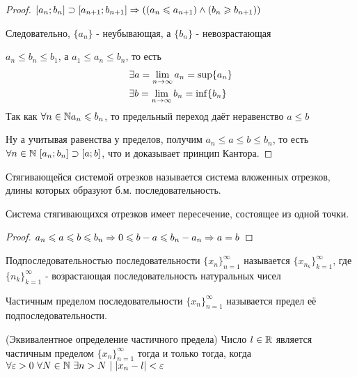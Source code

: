 \begin{proof}
	$[a_n; b_n] \supset [a_{n + 1}; b_{n + 1}] \Rightarrow \left((a_n \leqslant a_{n + 1}) \wedge (b_n \geqslant b_{n + 1})\right)$
	
	Следовательно, $\{a_n\}$ - неубывающая, а $\{b_n\}$ - невозрастающая
	
	$a_n \le b_n \le b_1$, а $a_1 \le a_n \le b_n$, то есть
	\begin{align*}
		&\exists a = \lim\limits_{n \rightarrow \infty} a_n = \sup \{a_n\}
		\\
		&\exists b = \lim\limits_{n \rightarrow \infty} b_n = \inf \{b_n\}
	\end{align*}
	Так как $\forall n \in \mathbb{N} a_n \leqslant b_n$, то предельный переход даёт неравенство $a \le b$
	
	Ну а учитывая равенства у пределов, получим $a_n \le a \le b \le b_n$, то есть $\forall n \in \mathbb{N}\ [a_n; b_n] \supset [a; b]$, что и доказывает принцип Кантора.
\end{proof}

\begin{definition}
	Стягивающейся системой отрезков называется система вложенных отрезков, длины которых образуют б.м. последовательность.
\end{definition}

\begin{addition}
	Система стягивающихся отрезков имеет пересечение, состоящее из одной точки.
\end{addition}

\begin{proof}
	$a_n \leqslant a \leqslant b \leqslant b_n \Rightarrow 0 \leqslant b - a \leqslant b_n - a_n \Rightarrow a = b$
\end{proof}

\begin{definition}
	Подпоследовательностью последовательности $\{x_n\}_{n = 1}^\infty$ называется $\{x_{n_k}\}_{k = 1}^\infty$, где $\{n_k\}_{k = 1}^\infty$ - возрастающая последовательность натуральных чисел
\end{definition}

\begin{definition}
	Частичным пределом последовательности $\{x_n\}_{n = 1}^\infty$ называется предел её подпоследовательности.
\end{definition}

\begin{theorem} (Эквивалентное определение частичного предела)
	Число $l \in \mathbb{R}$ является частичным пределом $\{x_n\}_{n = 1}^\infty$ тогда и только тогда, когда $\forall \varepsilon > 0\ \forall N \in \mathbb{N}\ \exists n > N\ |\ |x_n - l| < \varepsilon$
\end{theorem}

